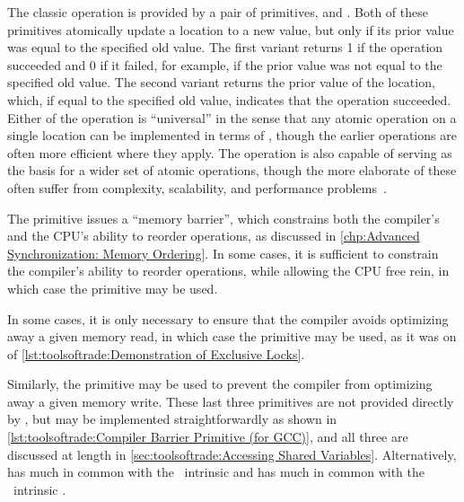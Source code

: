 The classic  operation is provided by a pair of
primitives,  and
.
Both of these primitives atomically update a location to a new value,
but only if its prior value was equal to the specified old value.
The first variant returns 1 if the operation succeeded and 0 if it
failed, for example, if the prior value was not equal to the specified
old value.
The second variant returns the prior value of the location, which, if
equal to the specified old value, indicates that the operation succeeded.
Either of the  operation is ``universal'' in the sense
that any atomic operation on a single location can be implemented in
terms of , though the earlier operations are often
more efficient where they apply.
The  operation is also capable of serving as the basis
for a wider set of atomic operations, though the more elaborate of
these often suffer from complexity, scalability, and performance
problems~\cite{MauriceHerlihy90a}.

\QuickQuizEnd

The  primitive issues a ``memory barrier'',
which constrains both the compiler's and the CPU's ability to reorder
operations, as discussed in
\cref{chp:Advanced Synchronization: Memory Ordering}.
In some cases, it is sufficient to constrain the compiler's ability
to reorder operations, while allowing the CPU free rein, in which
case the  primitive may be used.
\begin{fcvref}
In some cases, it is only necessary to ensure that the compiler
avoids optimizing away a given memory read, in which case the
 primitive may be used, as it was on  of
\cref{lst:toolsoftrade:Demonstration of Exclusive Locks}.
\end{fcvref}
Similarly, the  primitive may be used to prevent the
compiler from optimizing away a given memory write.
These last three primitives are not provided directly by \GCC,
but may be implemented straightforwardly as shown in
\cref{lst:toolsoftrade:Compiler Barrier Primitive (for GCC)},
and all three are discussed at length in
\cref{sec:toolsoftrade:Accessing Shared Variables}.
Alternatively,  has much in common with
the \GCC\  intrinsic
and  has much in common with the \GCC\ 
intrinsic .

